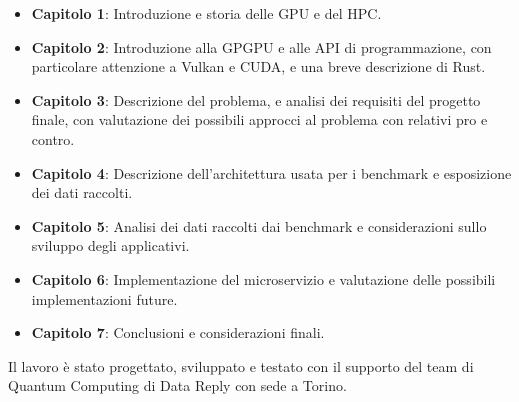 \begin{itemize}
    \item \textbf{Capitolo 1}: Introduzione e storia delle \gls{GPU} e del \gls{HPC}.
    \item \textbf{Capitolo 2}: Introduzione alla \gls{GPGPU} e alle \gls{API} di programmazione, con particolare attenzione a Vulkan e \gls{CUDA}, e una breve descrizione di Rust.
    \item \textbf{Capitolo 3}: Descrizione del problema, e analisi dei requisiti del progetto finale, con valutazione dei possibili approcci al problema con relativi pro e contro.
    \item \textbf{Capitolo 4}: Descrizione dell'architettura usata per i benchmark e esposizione dei dati raccolti.
    \item \textbf{Capitolo 5}: Analisi dei dati raccolti dai benchmark e considerazioni sullo sviluppo degli applicativi.
    \item \textbf{Capitolo 6}: Implementazione del microservizio e valutazione delle possibili implementazioni future.
    \item \textbf{Capitolo 7}: Conclusioni e considerazioni finali.
\end{itemize}

Il lavoro è stato progettato, sviluppato e testato con il supporto del team di Quantum Computing di Data Reply con sede a Torino.

